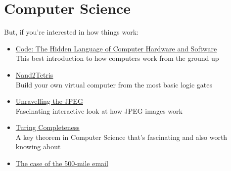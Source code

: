 \pagebreak

\section*{Computer Science}


But, if you're interested in how things work:

\begin{itemize}[leftmargin=*]
    \item
        \href{https://blackwells.co.uk/bookshop/product/Code-by-Charles-Petzold/9780735611313}{Code: The Hidden Language of Computer Hardware and Software}\\
        This best introduction to how computers work from the ground up
    \item
        \href{https://www.nand2tetris.org}{Nand2Tetris}\\
        Build your own virtual computer from the most basic logic gates
    \item
        \href{https://parametric.press/issue-01/unraveling-the-jpeg/}{Unravelling the JPEG}\\
        Fascinating interactive look at how JPEG images work
    \item
        \href{https://en.wikipedia.org/wiki/Turing_completeness}{Turing Completeness}\\
        A key theorem in Computer Science that's fascinating and also worth knowing about
    \item
        \href{https://www.ibiblio.org/harris/500milemail.html}{The case of the 500-mile email}
\end{itemize}
